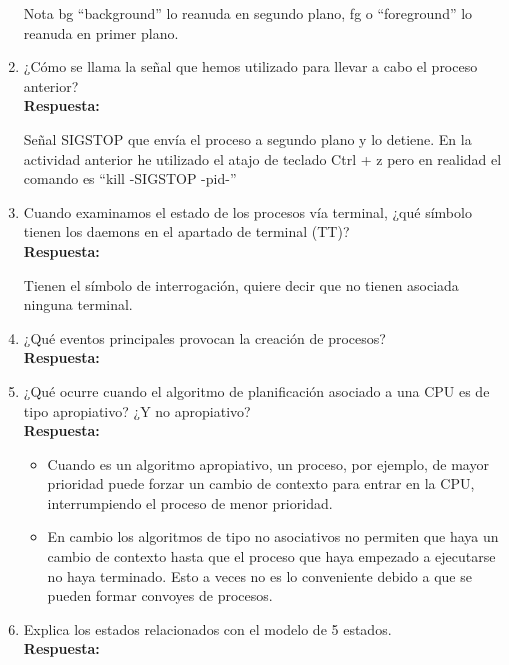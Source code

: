 \documentclass[a4paper,12pt]{article}
\begin{document}
\begin{enumerate}[label=\textbf{Pregunta \arabic*.}]
    Nota bg “background” lo reanuda en segundo plano, fg o “foreground” lo reanuda en primer plano.


    \item ¿Cómo se llama la señal que hemos utilizado para llevar a cabo el proceso anterior? \\
    \textbf{Respuesta:} %

    Señal SIGSTOP que envía el proceso a segundo plano y lo detiene. En la actividad anterior he utilizado el atajo de teclado Ctrl + z pero en realidad el comando es “kill -SIGSTOP -pid-”



    \item Cuando examinamos el estado de los procesos vía terminal, ¿qué símbolo tienen los daemons en el apartado de terminal (TT)? \\
    \textbf{Respuesta:}

    Tienen el símbolo de interrogación, quiere decir que no tienen asociada ninguna terminal.



    \item ¿Qué eventos principales provocan la creación de procesos? \\
    \textbf{Respuesta:}



    \item ¿Qué ocurre cuando el algoritmo de planificación asociado a una CPU es de tipo apropiativo? ¿Y no apropiativo? \\
    \textbf{Respuesta:}

    \begin{itemize}
         
    \item Cuando es un algoritmo apropiativo, un proceso, por ejemplo, de mayor prioridad puede forzar un cambio de contexto para entrar en la CPU, interrumpiendo el proceso de menor prioridad.

    \item En cambio los algoritmos de tipo no asociativos no permiten que haya un cambio de contexto hasta que el proceso que haya empezado a ejecutarse no haya terminado. Esto a veces no es lo conveniente debido a que se pueden formar convoyes de procesos.

    \end{itemize}


    \item Explica los estados relacionados con el modelo de 5 estados. \\ %
    \textbf{Respuesta:}



\end{enumerate}
\end{document}
